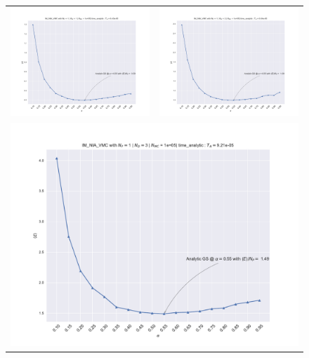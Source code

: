 \begin{figure}
\hspace{-2.8cm}
\begin{tabular}{cc}
\includegraphics[width = 0.5\paperwidth]{figures/c_figs/IM_NIA_np_1_nd_1.pdf} & \includegraphics[width = 0.5\paperwidth]{figures/c_figs/IM_NIA_np_1_nd_2.pdf} \\
\multicolumn{2}{c}{\includegraphics[width=0.5\paperwidth]{figures/c_figs/IM_NIA_np_1_nd_3.pdf} }

\end{tabular}
\end{figure}
